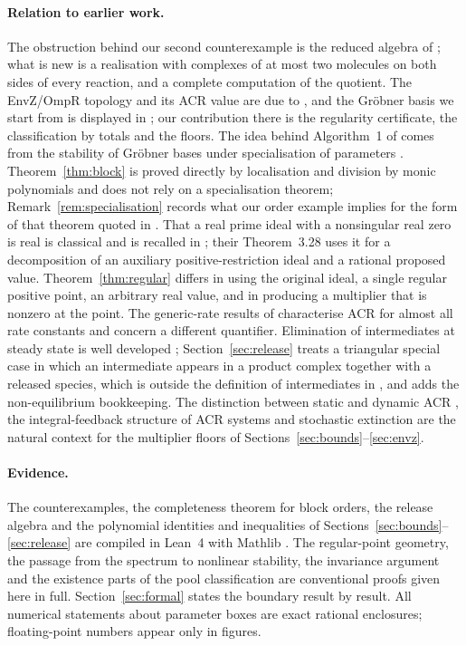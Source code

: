 \documentclass[11pt,a4paper]{article}
\theoremstyle{plain}
\theoremstyle{definition}
\theoremstyle{remark}
\begin{document}
\paragraph{Relation to earlier work.}
The obstruction behind our second counterexample is the reduced algebra of \cite[Example 3.12]{acr}; what is new is a realisation with complexes of at most two molecules on both sides of every reaction, and a complete computation of the quotient. The EnvZ/OmpR topology and its ACR value are due to \cite{shinarfeinberg}, and the Gr\"obner basis we start from is displayed in \cite[Example 3.15]{acr}; our contribution there is the regularity certificate, the classification by totals and the floors. The idea behind Algorithm~1 of \cite{acr} comes from the stability of Gr\"obner bases under specialisation of parameters \cite{weispfenning,kalkbrener,suzuki,montes}. Theorem~\ref{thm:block} is proved directly by localisation and division by monic polynomials and does not rely on a specialisation theorem; Remark~\ref{rem:specialisation} records what our order example implies for the form of that theorem quoted in \cite{acr}. That a real prime ideal with a nonsingular real zero is real is classical \cite[Section~3.3]{bcr} and is recalled in \cite[Proposition 3.27]{acr}; their Theorem~3.28 uses it for a decomposition of an auxiliary positive-restriction ideal and a rational proposed value. Theorem~\ref{thm:regular} differs in using the original ideal, a single regular positive point, an arbitrary real value, and in producing a multiplier that is nonzero at the point. The generic-rate results of \cite[Theorem~4.4 and Corollary~4.7]{generic} characterise ACR for almost all rate constants and concern a different quantifier. Elimination of intermediates at steady state is well developed \cite{fwlinear,fwptm,fwintermediate}; Section~\ref{sec:release} treats a triangular special case in which an intermediate appears in a product complex together with a released species, which is outside the definition of intermediates in \cite{fwintermediate}, and adds the non-equilibrium bookkeeping. The distinction between static and dynamic ACR \cite{dynamic}, the integral-feedback structure of ACR systems \cite{integral} and stochastic extinction \cite{aej} are the natural context for the multiplier floors of Sections~\ref{sec:bounds}--\ref{sec:envz}.

\paragraph{Evidence.}
The counterexamples, the completeness theorem for block orders, the release algebra and the polynomial identities and inequalities of Sections~\ref{sec:bounds}--\ref{sec:release} are compiled in Lean~4 \cite{lean4} with Mathlib \cite{mathlib}. The regular-point geometry, the passage from the spectrum to nonlinear stability, the invariance argument and the existence parts of the pool classification are conventional proofs given here in full. Section~\ref{sec:formal} states the boundary result by result. All numerical statements about parameter boxes are exact rational enclosures; floating-point numbers appear only in figures.
\end{document}
